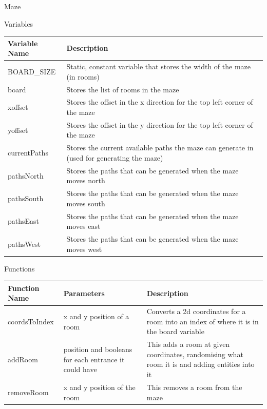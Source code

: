 \documentclass[../../Main.tex]{subfiles}
\begin{document}
    Maze
    \begin{center}
        Variables
        \begin{tabular}{ | m{} | m{} | }
            \hline
            \textbf{Variable Name} & \textbf{Description} \\
            \hline
            BOARD\_SIZE & Static, constant variable that stores the width of the maze (in rooms) \\
            \hline
            board & Stores the list of rooms in the maze \\
            \hline
            xoffset & Stores the offset in the x direction for the top left corner of the maze \\
            \hline
            yoffset & Stores the offset in the y direction for the top left corner of the maze \\
            \hline
            currentPaths & Stores the current available paths the maze can generate in (used for generating the maze)\\
            \hline
            pathsNorth & Stores the paths that can be generated when the maze moves north \\
            \hline
            pathsSouth & Stores the paths that can be generated when the maze moves south \\
            \hline
            pathsEast & Stores the paths that can be generated when the maze moves east \\
            \hline
            pathsWest & Stores the paths that can be generated when the maze moves west \\
            \hline
        \end{tabular}
        Functions
        \begin{tabular}{ | m{} | m{}| m{} | }
            \hline
            \textbf{Function Name} & \textbf{Parameters} & \textbf{Description} \\
            \hline
            coordsToIndex & x and y position of a room & Converts a 2d coordinates for a room into an index of where it is in the board variable \\
            \hline
            addRoom & position and booleans for each entrance it could have & This adds a room at given coordinates, randomising what room it is and adding entities into it \\
            \hline
            removeRoom & x and y position of the room & This removes a room from the maze \\

\end{tabular}
\end{center}
\end{document}
